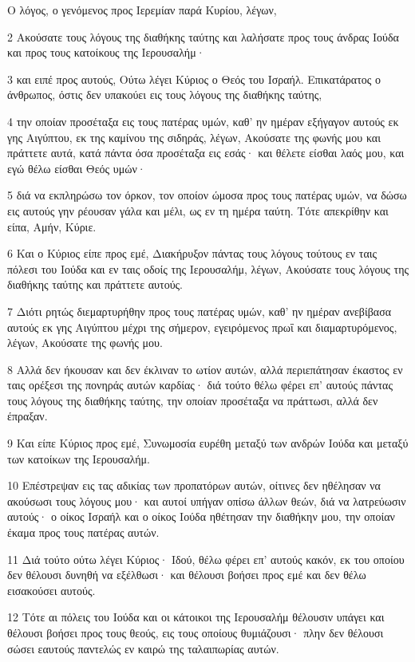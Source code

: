 \par Ο λόγος, ο γενόμενος προς Ιερεμίαν παρά Κυρίου, λέγων,
\par 2 Ακούσατε τους λόγους της διαθήκης ταύτης και λαλήσατε προς τους άνδρας Ιούδα και προς τους κατοίκους της Ιερουσαλήμ·
\par 3 και ειπέ προς αυτούς, Ούτω λέγει Κύριος ο Θεός του Ισραήλ. Επικατάρατος ο άνθρωπος, όστις δεν υπακούει εις τους λόγους της διαθήκης ταύτης,
\par 4 την οποίαν προσέταξα εις τους πατέρας υμών, καθ' ην ημέραν εξήγαγον αυτούς εκ γης Αιγύπτου, εκ της καμίνου της σιδηράς, λέγων, Ακούσατε της φωνής μου και πράττετε αυτά, κατά πάντα όσα προσέταξα εις εσάς· και θέλετε είσθαι λαός μου, και εγώ θέλω είσθαι Θεός υμών·
\par 5 διά να εκπληρώσω τον όρκον, τον οποίον ώμοσα προς τους πατέρας υμών, να δώσω εις αυτούς γην ρέουσαν γάλα και μέλι, ως εν τη ημέρα ταύτη. Τότε απεκρίθην και είπα, Αμήν, Κύριε.
\par 6 Και ο Κύριος είπε προς εμέ, Διακήρυξον πάντας τους λόγους τούτους εν ταις πόλεσι του Ιούδα και εν ταις οδοίς της Ιερουσαλήμ, λέγων, Ακούσατε τους λόγους της διαθήκης ταύτης και πράττετε αυτούς.
\par 7 Διότι ρητώς διεμαρτυρήθην προς τους πατέρας υμών, καθ' ην ημέραν ανεβίβασα αυτούς εκ γης Αιγύπτου μέχρι της σήμερον, εγειρόμενος πρωΐ και διαμαρτυρόμενος, λέγων, Ακούσατε της φωνής μου.
\par 8 Αλλά δεν ήκουσαν και δεν έκλιναν το ωτίον αυτών, αλλά περιεπάτησαν έκαστος εν ταις ορέξεσι της πονηράς αυτών καρδίας· διά τούτο θέλω φέρει επ' αυτούς πάντας τους λόγους της διαθήκης ταύτης, την οποίαν προσέταξα να πράττωσι, αλλά δεν έπραξαν.
\par 9 Και είπε Κύριος προς εμέ, Συνωμοσία ευρέθη μεταξύ των ανδρών Ιούδα και μεταξύ των κατοίκων της Ιερουσαλήμ.
\par 10 Επέστρεψαν εις τας αδικίας των προπατόρων αυτών, οίτινες δεν ηθέλησαν να ακούσωσι τους λόγους μου· και αυτοί υπήγαν οπίσω άλλων θεών, διά να λατρεύωσιν αυτούς· ο οίκος Ισραήλ και ο οίκος Ιούδα ηθέτησαν την διαθήκην μου, την οποίαν έκαμα προς τους πατέρας αυτών.
\par 11 Διά τούτο ούτω λέγει Κύριος· Ιδού, θέλω φέρει επ' αυτούς κακόν, εκ του οποίου δεν θέλουσι δυνηθή να εξέλθωσι· και θέλουσι βοήσει προς εμέ και δεν θέλω εισακούσει αυτούς.
\par 12 Τότε αι πόλεις του Ιούδα και οι κάτοικοι της Ιερουσαλήμ θέλουσιν υπάγει και θέλουσι βοήσει προς τους θεούς, εις τους οποίους θυμιάζουσι· πλην δεν θέλουσι σώσει εαυτούς παντελώς εν καιρώ της ταλαιπωρίας αυτών.
